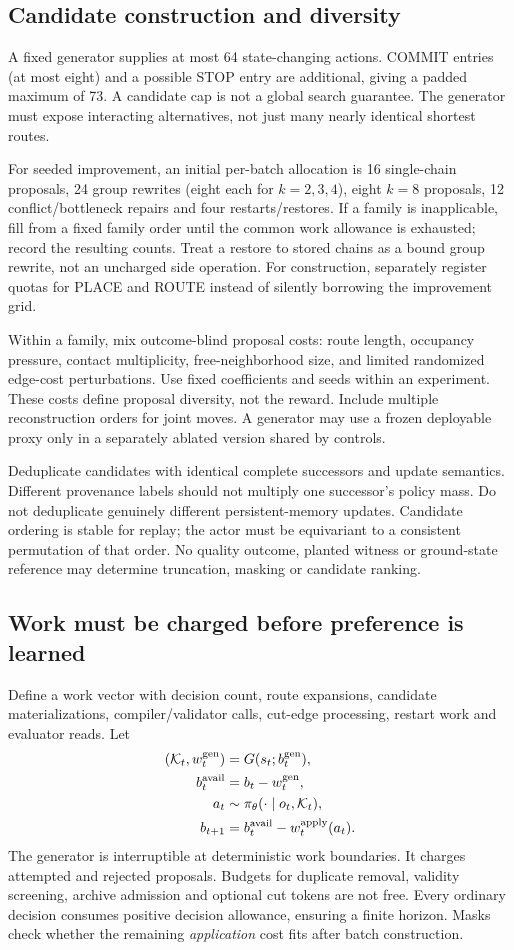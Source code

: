 \subsection{Candidate construction and diversity}
A fixed generator supplies at most 64 state-changing actions. COMMIT entries (at most eight) and a possible STOP entry are additional, giving a padded maximum of 73. A candidate cap is not a global search guarantee. The generator must expose interacting alternatives, not just many nearly identical shortest routes.

For seeded improvement, an initial per-batch allocation is 16 single-chain proposals, 24 group rewrites (eight each for $k=2,3,4$), eight $k=8$ proposals, 12 conflict/bottleneck repairs and four restarts/restores. If a family is inapplicable, fill from a fixed family order until the common work allowance is exhausted; record the resulting counts. Treat a restore to stored chains as a bound group rewrite, not an uncharged side operation. For construction, separately register quotas for PLACE and ROUTE instead of silently borrowing the improvement grid.

Within a family, mix outcome-blind proposal costs: route length, occupancy pressure, contact multiplicity, free-neighborhood size, and limited randomized edge-cost perturbations. Use fixed coefficients and seeds within an experiment. These costs define proposal diversity, not the reward. Include multiple reconstruction orders for joint moves. A generator may use a frozen deployable proxy only in a separately ablated version shared by controls.

Deduplicate candidates with identical complete successors and update semantics. Different provenance labels should not multiply one successor's policy mass. Do not deduplicate genuinely different persistent-memory updates. Candidate ordering is stable for replay; the actor must be equivariant to a consistent permutation of that order. No quality outcome, planted witness or ground-state reference may determine truncation, masking or candidate ranking.

\subsection{Work must be charged before preference is learned}
Define a work vector with decision count, route expansions, candidate materializations, compiler/validator calls, cut-edge processing, restart work and evaluator reads. Let
\begin{align}
(\mathcal K_t,w_t^{\rm gen})&=G(s_t;b_t^{\rm gen}),\\
b_t^{\rm avail}&=b_t-w_t^{\rm gen},\\
a_t&\sim\pi_\theta(\cdot\mid o_t,\mathcal K_t),\\
b_{t+1}&=b_t^{\rm avail}-w_t^{\rm apply}(a_t).
\end{align}
The generator is interruptible at deterministic work boundaries. It charges attempted and rejected proposals. Budgets for duplicate removal, validity screening, archive admission and optional cut tokens are not free. Every ordinary decision consumes positive decision allowance, ensuring a finite horizon. Masks check whether the remaining \emph{application} cost fits after batch construction.

